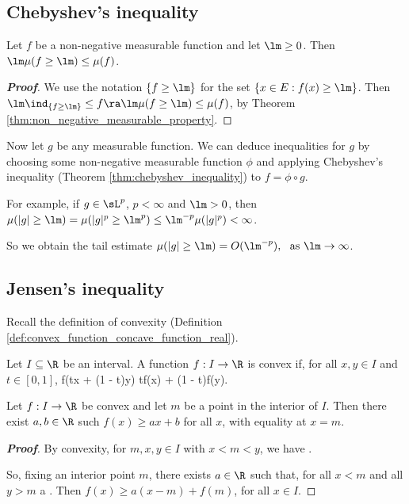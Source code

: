 \subsection{Chebyshev's inequality}

\begin{theorem}\label{thm:chebyshev_inequality}
Let $f$ be a non-negative measurable function and let $\lm \geq 0$. Then $\lm\mu(f \geq \lm) \leq \mu(f)$.
\end{theorem}
\begin{proof}[\bf Proof]
We use the notation $\{f \geq \lm\}$ for the set $\{x \in E : f(x) \geq \lm\}$. Then $\lm\ind_{\{f\geq\lm\}} \leq f  \ra \lm\mu(f \geq \lm) \leq \mu(f)$, by Theorem \ref{thm:non_negative_measurable_property}.
\end{proof}

Now let $g$ be any measurable function. We can deduce inequalities for $g$ by choosing some non-negative measurable function $\phi$ and applying Chebyshev's inequality (Theorem \ref{thm:chebyshev_inequality}) to $f = \phi \circ g$.

For example, if $g \in \sL^p$, $p < \infty$ and $\lm > 0$, then $\mu(|g| \geq \lm) = \mu(|g|^p \geq \lm^p) \leq \lm^{-p}\mu(|g|^p) < \infty$.

So we obtain the tail estimate $\mu(|g| \geq \lm) = O(\lm^{-p}),\ \text{ as }\lm \to \infty$.


\subsection{Jensen's inequality}

Recall the definition of convexity (Definition \ref{def:convex_function_concave_function_real}).

\begin{definition}
Let $I \subseteq \R$ be an interval. A function $f : I \to \R$ is convex if, for all $x, y \in I$ and $t \in [0, 1]$,
\be
f(tx + (1 - t)y) \leq tf(x) + (1 - t)f(y).
\ee
\end{definition}

\begin{lemma}\label{lem:jensen_affine}
Let $f : I \to \R$ be convex and let $m$ be a point in the interior of $I$. Then there exist $a, b \in \R$ such $f(x) \geq ax + b$ for all $x$, with equality at $x = m$.
\end{lemma}

\begin{proof}[\bf Proof]
By convexity, for $m, x, y \in I$ with $x < m < y$, we have
\be
{} \leq {}.
\ee

So, fixing an interior point $m$, there exists $a \in \R$ such that, for all $x < m$ and all $y > m$
\be
{} \leq a \leq {}.
\ee
Then $f(x) \geq a(x - m) + f(m)$, for all $x \in I$.
\end{proof}

